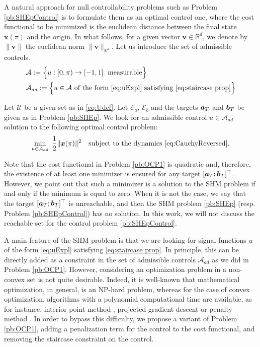 \documentclass[twocolumn]{autart}    %
\begin{document}
A natural approach for null controllability problems such as Problem \ref{pb:SHEpControl} is to formulate them as an optimal control one, where the cost functional to be minimized is the euclidean distance between the final state $\bm{x}(\pi)$ and the origin. In what follows, for a given vector $\bm{v}\in\mathbb{R}^d$, we  denote by $\|\bm{v}\|$ the euclidean norm $\|\bm{v}\|_{\mathbb{R}^d}$.  
Let us introduce the set of admissible controls.
\begin{align*}
	&\mathcal A:= \Big\{u:[0,\pi)\to [-1,1]\; \text{ measurable}\Big\}
	\\
	&\mathcal A_{ad}:= \Big\{u\in\mathcal A \text{ of the form } \eqref{eq:uExpl} \text{ satisfying } \eqref{eq:staircase prop}\Big\}
\end{align*}

\begin{problem}\label{pb:OCP1}
	Let $\mathcal{U}$ be a given set as in \eqref{eq:Udef}. Let $\mathcal{E}_a$, $\mathcal{E}_b$ and the targets $\bm{a}_T$ and $\bm{b}_T$ be given as in Problem \ref{pb:SHEp}. We look for an admissible control $u\in \mathcal{A}_{ad}$ solution to the following optimal control problem:
	\begin{equation*}
		\min_{u \in \mathcal{A}_{ad}}\;\frac 12 \|\bm{x}(\pi)\|^2 \quad \text{subject to the dynamics \eqref{eq:CauchyReversed}}.
	\end{equation*}
\end{problem} 

\begin{remark}
	Note that the cost functional in Problem \ref{pb:OCP1} is quadratic and, therefore, the existence of at least one minimizer is ensured for any target $[\bm{a}_T;\bm{b}_T]^\top$. However, we point out that such a minimizer is a solution to the SHM problem if and only if the minimum is equal to zero. When it is not the case, we say that the target $[\bm{a}_T;\bm{b}_T]^\top$ is unreachable, and then the SHM problem \ref{pb:SHEp} (resp. Problem \ref{pb:SHEpControl}) has no solution.  In this work, we will not discuss the reachable set for the control problem \ref{pb:SHEpControl}.
\end{remark}

A main feature of the SHM problem is that we are looking for signal functions $u$ of the form \eqref{eq:uExpl} satisfying \eqref{eq:staircase prop}. In principle, this can be directly added as a constraint in the set of admissible controls $\mathcal{A}_{ad}$ as we did in Problem \ref{pb:OCP1}. However, considering an optimization problem in a non-convex set is not quite desirable. Indeed, it is well-known that mathematical optimization, in general, is an NP-hard problem, whereas for the case of convex optimization, algorithms with a polynomial computational time are available, as for instance, interior point method \cite{helmberg1996interior}, projected gradient descent \cite{ calamai1987projected} or penalty method \cite{eremin1967penalty}. In order to bypass this difficulty, we propose a variant of Problem \ref{pb:OCP1}, adding a penalization term for the control to the cost functional, and removing the staircase constraint on the control. 
\end{document}
